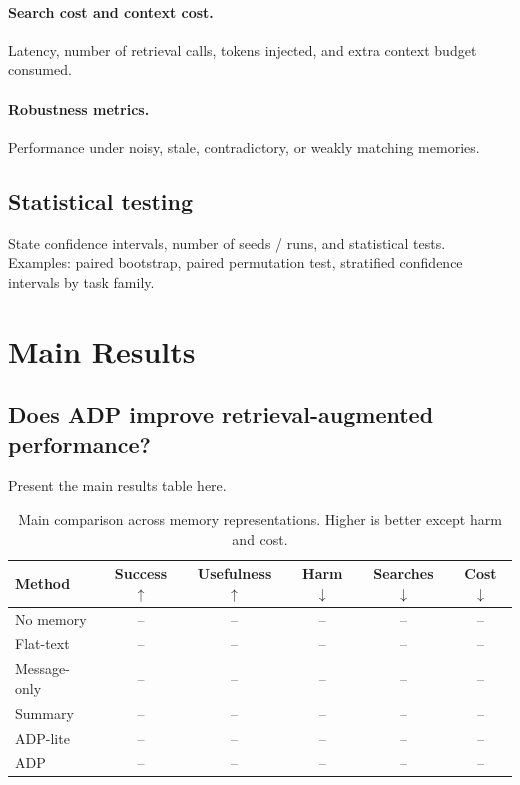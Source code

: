 \documentclass{article}
\newcommand{\ADP}{\textsc{ADP}}
\begin{document}
\paragraph{Search cost and context cost.}
Latency, number of retrieval calls, tokens injected, and extra context budget consumed.

\paragraph{Robustness metrics.}
Performance under noisy, stale, contradictory, or weakly matching memories.

\subsection{Statistical testing}
State confidence intervals, number of seeds / runs, and statistical tests.
Examples:
paired bootstrap, paired permutation test, stratified confidence intervals by task family.

\section{Main Results}

\subsection{Does \ADP{} improve retrieval-augmented performance?}
Present the main results table here.

\begin{table}[t]
    \centering
    \small
    \caption{Main comparison across memory representations. Higher is better except harm and cost.}
    \label{tab:main-results}
    \begin{tabular}{lccccc}
        \toprule
        Method & Success $\uparrow$ & Usefulness $\uparrow$ & Harm $\downarrow$ & Searches $\downarrow$ & Cost $\downarrow$ \\
        \midrule
        No memory & -- & -- & -- & -- & -- \\
        Flat-text & -- & -- & -- & -- & -- \\
        Message-only & -- & -- & -- & -- & -- \\
        Summary & -- & -- & -- & -- & -- \\
        \ADP{}-lite & -- & -- & -- & -- & -- \\
        \ADP{} & -- & -- & -- & -- & -- \\
        \bottomrule
    \end{tabular}
\end{table}
\end{document}
